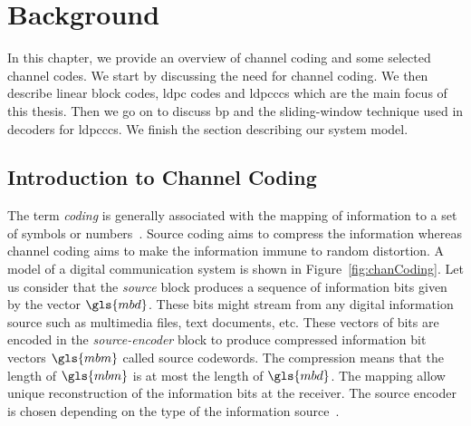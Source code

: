 \chapter{Background}\label{ch:back}
In this chapter, we provide an overview of channel coding and some selected channel codes. We start by discussing the need for channel coding. We then describe linear block codes, \gls{ldpc} codes and \glspl{ldpccc} which are the main focus of this thesis. Then we go on to discuss \gls{bp} and the sliding-window technique used in decoders for \glspl{ldpccc}. We finish the section describing our system model.

\section{Introduction to Channel Coding}
The term \emph{coding} is generally associated with the mapping of information to a set of symbols or numbers~\cite{Bossert}. Source coding aims to compress the information whereas channel coding aims to make the information immune to random distortion. A model of a digital communication system is shown in Figure~\ref{fig:chanCoding}. Let us consider that the \emph{source} block produces a sequence of information bits given by the vector $\gls{mbd}$. These bits might stream from any digital information source such as multimedia files, text documents, etc. These vectors of bits are encoded in the \emph{source-encoder} block to produce compressed information bit vectors $\gls{mbm}$ called source codewords. The compression means that the length of $\gls{mbm}$ is at most the length of $\gls{mbd}$. The mapping allow unique reconstruction of the information bits at the receiver. The source encoder is chosen depending on the type of the information source~\cite{proak}.

